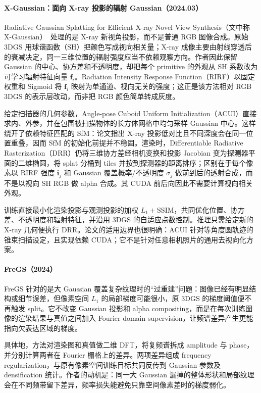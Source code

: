 \paragraph{X-Gaussian：面向 X-ray 投影的辐射 Gaussian（2024.03）}
Radiative Gaussian Splatting for Efficient X-ray Novel View Synthesis（文中称 X-Gaussian）~\cite{2403_04116}处理的是 X-ray 新视角投影，而不是普通 RGB 图像合成。原始 3DGS 用球谐函数（SH）把颜色写成视向相关量；X-ray 成像主要由射线穿透后的衰减决定，同一三维位置的辐射强度应当不依赖观察方向。作者因此保留 Gaussian 的中心、协方差和不透明度，却把每个 primitive 的外观从 SH 系数改为可学习辐射特征向量 $\mathbf f_i$。Radiation Intensity Response Function（RIRF）以固定权重和 Sigmoid 将 $\mathbf f_i$ 映射为单通道、视向无关的强度；这正是该方法相对 RGB 3DGS 的表示层改动，而非把 RGB 颜色简单转成灰度。

给定扫描器的几何参数，Angle-pose Cuboid Uniform Initialization（ACUI）直接求内、外参，并在包围被扫描物体的长方体网格中均匀采样 Gaussian 中心。这样绕开了依赖特征匹配的 SfM：论文指出 X-ray 投影低对比且不同深度会在同一位置重叠，因而 SfM 的初始化前提并不稳固。渲染时，Differentiable Radiative Rasterization（DRR）仍将三维协方差经相机变换和投影 Jacobian 变为探测器平面的二维椭圆，将 splat 分桶到 tiles 并按到探测器的距离排序；区别在于每个像素以 RIRF 强度 $\mathbf i_j$ 和 Gaussian 覆盖概率/不透明度 $\sigma_j$ 做前到后的透射合成，而不是以视向 SH RGB 做 alpha 合成。其 CUDA 前后向因此不需要计算视向相关外观。

训练直接最小化渲染投影与观测投影的加权 $L_1+\mathrm{SSIM}$，共同优化位置、协方差、不透明度和辐射特征，并沿用 3DGS 的自适应点数控制。推理只需给定新的 X-ray 几何便执行 DRR。论文的适用边界也很明确：ACUI 针对等角度圆轨迹的锥束扫描设定，且实现依赖 CUDA；它不是针对任意相机照片的通用去视向化方案。


\paragraph{FreGS（2024）\cite{2403_06908}}
FreGS 针对的是大 Gaussian 覆盖复杂纹理时的“过重建”问题：图像已经有明显结构或细节误差，但像素空间 $L_1$ 的局部梯度可能很小，原 3DGS 的梯度阈值便不再触发 split。它不改变 Gaussian 投影和 alpha compositing，而是在每次训练图像的渲染结果与真值之间加入 Fourier-domain supervision，让频谱差异产生更能指向欠表达区域的梯度。

具体地，方法对渲染图和真值做二维 DFT，将复频谱拆成 amplitude 与 phase，并分别计算两者在 Fourier 栅格上的差异。两项差异组成 frequency regularization，与原有像素空间训练目标共同反传到 Gaussian 参数及 densification 统计。作者的动机是：同一大 Gaussian 漏掉的整体形状和局部纹理会在不同频带留下差异，频率损失能避免只靠空间像素差时的梯度弱化。

